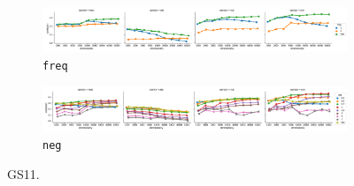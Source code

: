 \begin{figure}
  \centering

  \begin{subfigure}[t]{\textwidth}
    \includegraphics[width=1.1\textwidth]{supplement/figures/gs11-interaction-freq}

  \caption{\texttt{freq}}
  \label{fig:gs11-freq}
  \end{subfigure}

  \begin{subfigure}[t]{\textwidth}
    \includegraphics[width=1.1\textwidth]{supplement/figures/gs11-interaction-neg}

  \caption{\texttt{neg}}
  \label{fig:gs11-neg}
  \end{subfigure}

  \caption{GS11.}
\end{figure}
